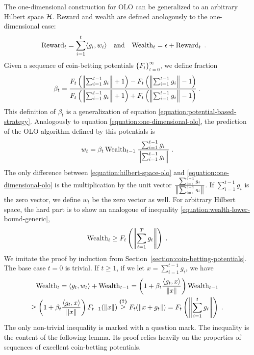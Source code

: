 The one-dimensional construction for OLO can be generalized to an arbitrary
Hilbert space $\mathcal{H}$. Reward and wealth are defined anologously
to the one-dimensional case:
\begin{align*}
\operatorname{Reward}_t &= \sum_{i=1}^t \langle g_i, w_i \rangle &
& \text{and} &
\operatorname{Wealth}_t &= \epsilon + \operatorname{Reward}_t \; .
\end{align*}
Given a sequence of coin-betting potentials $\{F_t\}_{t=0}^\infty$,
we define fraction
\begin{equation}
\label{equation:potential-based-strategy-hilbert-space}
\beta_t = \frac{F_t \left(\left\|{\sum_{i=1}^{t-1} g_i}\right\| + 1\right) - F_t\left(\left\|{\sum_{i=1}^{t-1} g_i}\right\| - 1 \right)}{F_t\left(\left\|{\sum_{i=1}^{t-1} g_i}\right\| + 1 \right) + F_t\left(\left\|{\sum_{i=1}^{t-1} g_i}\right\| - 1 \right)} \; .
\end{equation}
This definition of $\beta_t$ is a generalization of equation
\eqref{equation:potential-based-strategy}.  Analogously to equation
\eqref{equation:one-dimensional-olo}, the prediction of the OLO algorithm
defined by this potentials is
\begin{equation}
\label{equation:hilbert-space-olo}
w_t = \beta_t \operatorname{Wealth}_{t-1} \frac{\sum_{i=1}^{t-1} g_i}{\left\|{\sum_{i=1}^{t-1} g_i}\right\|}  \; .
\end{equation}
The only difference between \eqref{equation:hilbert-space-olo} and
\eqref{equation:one-dimensional-olo} is the multiplication by the unit vector
$\frac{\sum_{i=1}^{t-1} g_i}{\left\|{\sum_{i=1}^{t-1} g_i}\right\|}$. If $\sum_{i=1}^{t-1}
g_i$ is the zero vector, we define $w_t$ be the zero vector as well. For
arbitrary Hilbert space, the hard part is to show an analogoue of
inequality \eqref{equation:wealth-lower-bound-generic},
\begin{equation}
\label{equation:wealth-lower-bound-hilbert-space}
\operatorname{Wealth}_t \ge F_t\left(\left\|{\sum_{t=1}^T g_t}\right\| \right) \; .
\end{equation}
We imitate the proof by induction from Section~\ref{section:coin-betting-potentials}.
The base case $t=0$ is trivial. If $t \ge 1$, if we let $x = \sum_{i=1}^{t-1} g_i$,
we have
\begin{multline*}
\operatorname{Wealth}_t
= \langle g_t, w_t \rangle + \operatorname{Wealth}_{t-1}
= \left(1 + \beta_t \frac{\langle g_t, x \rangle}{\|x\|} \right) \operatorname{Wealth}_{t-1} \\
\ge \left(1 + \beta_t \frac{\langle g_t, x \rangle}{\|x\|} \right) F_{t-1}(\left\|{x}\right\|)
\stackrel{\text{\textbf{(?)}}}{\ge} F_t(\left\|{x + g_t}\right\|)
= F_t\left(\left\|{\sum_{i=1}^t g_i}\right\| \right) \; .
\end{multline*}
The only non-trivial inequality is marked with a question mark.
The inequality is the content of the following lemma. Its proof relies heavily
on the properties of sequences of excellent coin-betting potentials.

